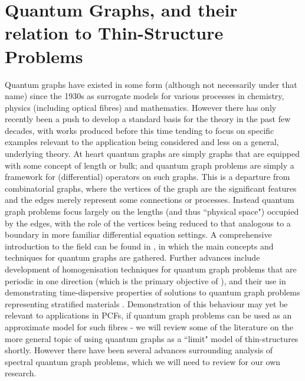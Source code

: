 \section{Quantum Graphs, and their relation to Thin-Structure Problems} \label{sec:GraphLitReview}
Quantum graphs have existed in some form (although not necessarily under that name) since the 1930s \cite{berkolaiko2013introduction} as surrogate models for various processes in chemistry, physics (including optical fibres) and mathematics.
However there has only recently been a push to develop a standard basis for the theory in the past few decades, with works produced before this time tending to focus on specific examples relevant to the application being considered and less on a general, underlying theory.
At heart quantum graphs are simply graphs that are equipped with some concept of length or bulk; and quantum graph problems are simply a framework for (differential) operators on such graphs.
This is a departure from combinatorial graphs, where the vertices of the graph are the significant features and the edges merely represent some connections or processes.
Instead quantum graph problems focus largely on the lengths (and thus ``physical space") occupied by the edges, with the role of the vertices being reduced to that analogous to a boundary in more familiar differential equation settings.
A comprehensive introduction to the field can be found in \cite{berkolaiko2013introduction}, in which the main concepts and techniques for quantum graphs are gathered.
Further advances include development of homogenisation techniques for quantum graph problems that are periodic in one direction (which is the primary objective of \cite{cherednichenko2018unified}), and their use in demonstrating time-dispersive properties of solutions to quantum graph problems representing stratified materials \cite{cherednichenko2019time}.
Demonstration of this behaviour may yet be relevant to applications in PCFs, if quantum graph problems can be used as an approximate model for such fibres - we will review some of the literature on the more general topic of using quantum graphs as a ``limit" model of thin-structures shortly.
However there have been several advances surrounding analysis of spectral quantum graph problems, which we will need to review for our own research.  \newline

